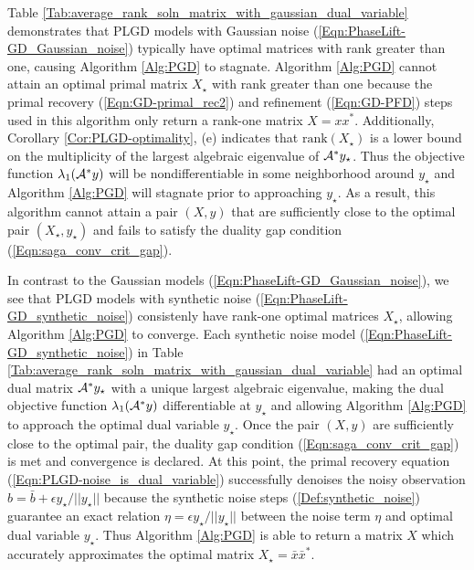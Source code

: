 \begin{enumerate}
Table \ref{Tab:average_rank_soln_matrix_with_gaussian_dual_variable} demonstrates that PLGD models with Gaussian noise (\ref{Eqn:PhaseLift-GD_Gaussian_noise}) typically have optimal matrices with rank greater than one, causing Algorithm \ref{Alg:PGD} to stagnate.  Algorithm \ref{Alg:PGD} cannot attain an optimal primal matrix $X_\star$ with rank greater than one because the primal recovery (\ref{Eqn:GD-primal_rec2}) and refinement (\ref{Eqn:GD-PFD}) steps used in this algorithm only return a rank-one matrix $X = xx^*$.  Additionally, Corollary \ref{Cor:PLGD-optimality}, (e) indicates that $\text{rank}(X_\star)$ is a lower bound on the multiplicity of the largest algebraic eigenvalue of ${\mathcal A}^*y_\star$.  Thus the objective function $\lambda_1({\mathcal A}^*y)$ will be nondifferentiable in some neighborhood around $y_\star$ and Algorithm \ref{Alg:PGD} will stagnate prior to approaching $y_\star$.  As a result, this algorithm cannot attain a pair $(X,y)$ that are sufficiently close to the optimal pair $(X_\star, y_\star)$ and fails to satisfy the duality gap condition (\ref{Eqn:saga_conv_crit_gap}).


In contrast to the Gaussian models (\ref{Eqn:PhaseLift-GD_Gaussian_noise}), we see that PLGD models with synthetic noise (\ref{Eqn:PhaseLift-GD_synthetic_noise}) consistenly have rank-one optimal matrices $X_\star$, allowing Algorithm \ref{Alg:PGD} to converge.  
Each synthetic noise model (\ref{Eqn:PhaseLift-GD_synthetic_noise}) in Table \ref{Tab:average_rank_soln_matrix_with_gaussian_dual_variable} had an optimal dual matrix ${\mathcal A}^*y_\star$ with a unique largest algebraic eigenvalue, making the dual objective function $\lambda_1({\mathcal A}^*y)$ differentiable at $y_\star$ and allowing Algorithm \ref{Alg:PGD} to approach the optimal dual variable $y_\star$.  
Once the pair $(X,y)$ are sufficiently close to the optimal pair, the duality gap condition (\ref{Eqn:saga_conv_crit_gap}) is met and convergence is declared.
At this point, the primal recovery equation (\ref{Eqn:PLGD-noise_is_dual_variable}) successfully denoises the noisy observation $b = \bar{b} + \epsilon y_\star / ||y_\star||$ because the synthetic noise steps (\ref{Def:synthetic_noise}) guarantee an exact relation $\eta = \epsilon y_\star / ||y_\star||$ between the noise term $\eta$ and optimal dual variable $y_\star$.
Thus Algorithm \ref{Alg:PGD} is able to return a matrix $X$ which accurately approximates the optimal matrix $X_\star = \bar{x}\bar{x}^*$.  









\end{enumerate}

